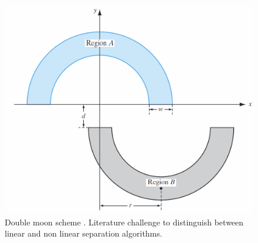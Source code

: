 \begin{figure}[!h]
\centering
\includegraphics[width=.6\columnwidth]{images/105doublemoon2}
\caption[Double moon scheme]{Double moon scheme \cite{RefWorks:158}. Literature
challenge to distinguish between linear and non linear separation algorithms.}
\label{fig:105doublemoon2}
\end{figure}